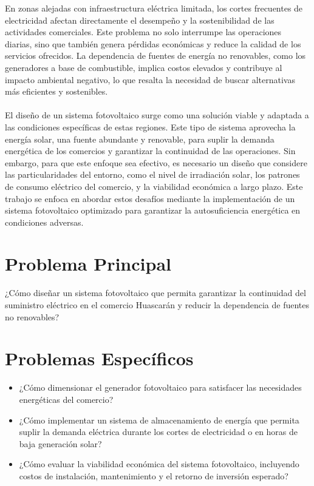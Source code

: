 En zonas alejadas con infraestructura eléctrica limitada, los cortes frecuentes de electricidad afectan directamente el desempeño y la sostenibilidad de las actividades comerciales. Este problema no solo interrumpe las operaciones diarias, sino que también genera pérdidas económicas y reduce la calidad de los servicios ofrecidos. La dependencia de fuentes de energía no renovables, como los generadores a base de combustible, implica costos elevados y contribuye al impacto ambiental negativo, lo que resalta la necesidad de buscar alternativas más eficientes y sostenibles.
\\
\\
El diseño de un sistema fotovoltaico surge como una solución viable y adaptada a las condiciones específicas de estas regiones. Este tipo de sistema aprovecha la energía solar, una fuente abundante y renovable, para suplir la demanda energética de los comercios y garantizar la continuidad de las operaciones. Sin embargo, para que este enfoque sea efectivo, es necesario un diseño que considere las particularidades del entorno, como el nivel de irradiación solar, los patrones de consumo eléctrico del comercio, y la viabilidad económica a largo plazo. Este trabajo se enfoca en abordar estos desafíos mediante la implementación de un sistema fotovoltaico optimizado para garantizar la autosuficiencia energética en condiciones adversas.


\section{Problema Principal}
¿Cómo diseñar un sistema fotovoltaico que permita garantizar la continuidad del suministro eléctrico en el comercio Huascarán y reducir la dependencia de fuentes no renovables?

\section{Problemas Específicos}
\begin{itemize}
  \item ¿Cómo dimensionar el generador fotovoltaico para satisfacer las necesidades energéticas del comercio?
  \item ¿Cómo implementar un sistema de almacenamiento de energía que permita suplir la demanda eléctrica durante los cortes de electricidad o en horas de baja generación solar?
  \item ¿Cómo evaluar la viabilidad económica del sistema fotovoltaico, incluyendo costos de instalación, mantenimiento y el retorno de inversión esperado?
\end{itemize}

